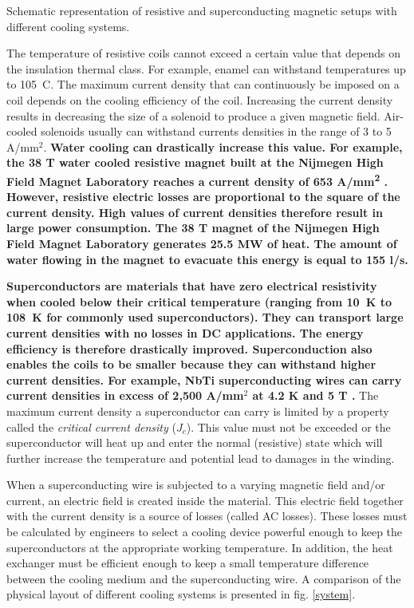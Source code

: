 \documentclass{ws-jmrr}
\begin{document}
\begin{multicols}{2}
\begin{figurehere}
\begin{center}
	\caption{Schematic representation of resistive and superconducting magnetic setups with different cooling systems.}
	\label{system}
	\end{center}
\end{figurehere}
\vspace{20mm}
The temperature of resistive coils cannot exceed a certain value that depends on the insulation thermal class. For example, enamel can withstand temperatures up to 105\degree~C.
The maximum current density that can continuously be imposed on a coil depends on the cooling efficiency of the coil. Increasing the current density results in decreasing the size of a solenoid to produce a given magnetic field. Air-cooled solenoids usually can withstand currents densities in the range of 3 to 5 A/mm$^2$. \textbf{Water cooling can drastically increase this value. For example, the 38 T water cooled resistive magnet built at the Nijmegen High Field Magnet Laboratory reaches a current density of 653 A/mm\textsuperscript{2} \cite{mag1 , mag2}. However, resistive electric losses are proportional to the square of the current density. High values of current densities therefore result in large power consumption. The 38 T magnet of the Nijmegen High Field Magnet Laboratory generates 25.5 MW of heat. The amount of water flowing in the magnet to evacuate this energy is equal to 155 l/s.}\par
\textbf{Superconductors are materials that have zero electrical resistivity when cooled below their critical temperature (ranging from 10~K to 108~K for commonly used superconductors). They can transport large current densities with no losses in DC applications. The energy efficiency is therefore drastically improved. Superconduction also enables the coils to be smaller because they can withstand higher current densities. For example, NbTi superconducting wires can carry current densities in excess of 2,500 A/mm$^2$ at 4.2 K and 5 T \cite{muzzi2011test , godeke2007limits}.} The maximum current density a superconductor can carry is limited by a property called the \emph{critical current density} ($J_c$). This value must not be exceeded or the superconductor will heat up and enter the normal (resistive) state which will further increase the temperature and potential lead to damages in the winding.\par
When a superconducting wire is subjected to a varying magnetic field and/or current, an electric field is created inside the material. This electric field together with the current density is a source of losses (called AC losses). These losses must be calculated by engineers to select a cooling device powerful enough to keep the superconductors at the appropriate working temperature. In addition, the heat exchanger must be efficient enough to keep a small temperature difference between the cooling medium and the superconducting wire. A comparison of the physical layout of different cooling systems is presented in fig. \ref{system}.\par

\end{multicols}
\end{document}

